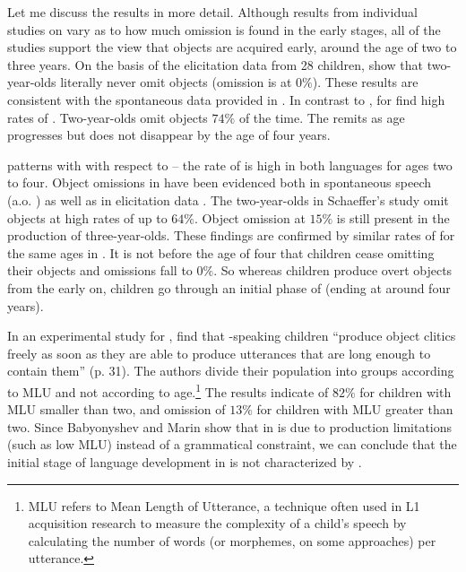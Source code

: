 \documentclass[output=paper,modfonts,newtxmath,hidelinks,]{langscibook}
\begin{document}
Let me discuss the results in more detail. Although results from individual studies on  vary as to how much omission is found in the early stages, all of the studies support the view that  objects are acquired early, around the age of two to three years. On the basis of the elicitation data from 28 children, \citet{Wexler-etal2004} show that two-year-olds literally never omit objects (omission is at $0\%$). These results are consistent with the spontaneous data provided in \citet{Stiasny2006}. In contrast to , for  \citet{Wexler-etal2004} find high rates of . Two-year-olds omit objects $74\%$ of the time. The  remits as age progresses but does not disappear by the age of four years.

 patterns with  with respect to  -- the rate of  is high in both languages for ages two to four. Object omissions in  have been evidenced both in spontaneous speech (a.o. \citealt{Guasti1993}) as well as in elicitation data \citep{Schaeffer2000}. The two-year-olds in Schaeffer’s study omit objects at high rates of up to $64\%$. Object omission at $15\%$ is still present in the production of three-year-olds. These findings are confirmed by similar rates of  for the same ages in \citet{Tedeschi2009}. It is not before the age of four that  children cease omitting their objects and omissions fall to $0\%$. So whereas  children produce overt objects from the early on,  children go through an initial phase of  (ending at around four years).

In an experimental study for , \citet{Babyonyshev-Marin2006} find that -speaking children “produce object clitics freely as soon as they are able to produce utterances that are long enough to contain them” (p. 31). The authors divide their population into groups according to MLU and not according to age.\footnote{\label{17:fn4}MLU refers to Mean Length of Utterance, a technique often used in L1 acquisition research to measure the complexity of a child’s speech by calculating the number of words (or morphemes, on some approaches) per utterance.} The results indicate  of $82\%$ for children with MLU smaller than two, and omission of $13\%$ for children with MLU greater than two. Since Babyonyshev and Marin show that  in  is due to production limitations (such as low MLU) instead of a grammatical constraint, we can conclude that the initial stage of language development in  is not characterized by .
\end{document}
